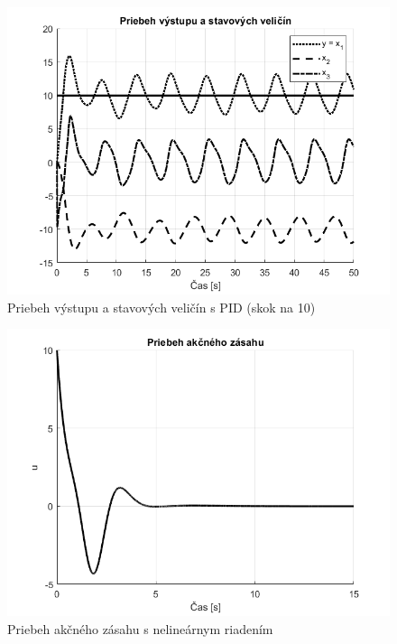 \documentclass[../main.tex]{subfiles}
\begin{document}
	\begin{figure}[h!]
		\centering
		\includegraphics[width=0.8\linewidth]{SimulaciaPIDVelkySkok}
		\caption{Priebeh výstupu a stavových veličín s PID (skok na 10)}
		\label{fig:svlvs2_SimulaciaPIDVelkySkok}
	\end{figure}

	\begin{figure}[h!]
		\centering
		\includegraphics[width=0.8\linewidth]{SimulaciaNelinU}
		\caption{Priebeh akčného zásahu s nelineárnym riadením}
		\label{fig:svlvs2_simulaciaNelinU}
	\end{figure}
\end{document}
